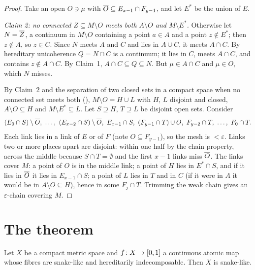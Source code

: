 \begin{proof}
Take an open $O\ni\mu$ with $\overline{O}\subseteq E_{x-1}\cap F_{y-1}$, and let $E^*$ be the union of $E$.

\emph{Claim 2: no connected $Z\subseteq M\setminus O$ meets both $A\setminus O$ and $M\setminus E^*$.} Otherwise let $N=\overline{Z}$, a continuum in $M\setminus O$
containing a point $a\in A$ and a point $z\notin E^*$; then $z\notin A$, so $z\in C$. Since $N$ meets $A$ and $C$ and lies in $A\cup C$, it meets $A\cap C$.
By hereditary unicoherence $Q=N\cap C$ is a continuum; it lies in $C$, meets $A\cap C$, and contains $z\notin A\cap C$. By Claim~1, $A\cap C\subseteq Q\subseteq
N$. But $\mu\in A\cap C$ and $\mu\in O$, which $N$ misses.

By Claim~2 and the separation of two closed sets in a compact space when no connected set meets both (), $M\setminus O=H\cup L$ with $H$,
$L$ disjoint and closed, $A\setminus O\subseteq H$ and $M\setminus E^*\subseteq L$. Let $S\supseteq H$, $T\supseteq L$ be disjoint open sets. Consider
\[
(E_0\cap S)\setminus\overline{O},\ \dots,\ (E_{x-2}\cap S)\setminus\overline{O},\ E_{x-1}\cap S,\ (F_{y-1}\cap T)\cup O,\ F_{y-2}\cap T,\ \dots,\ F_0\cap T.
\]
Each link lies in a link of $E$ or of $F$ (note $O\subseteq F_{y-1}$), so the mesh is $<\varepsilon$. Links two or more places apart are disjoint: within one
half by the chain property, across the middle because $S\cap T=\emptyset$ and the first $x-1$ links miss $\overline{O}$. The links cover $M$: a point of $O$ is in
the middle link; a point of $H$ lies in $E^*\cap S$, and if it lies in $\overline{O}$ it lies in $E_{x-1}\cap S$; a point of $L$ lies in $T$ and in $C$ (if it were
in $A$ it would be in $A\setminus O\subseteq H$), hence in some $F_j\cap T$. Trimming the weak chain gives an $\varepsilon$-chain covering $M$.
\end{proof}


\section{The theorem}

\begin{theorem}\label{thm:atomic-snake}
Let $X$ be a compact metric space and $f\colon X\to[0,1]$ a continuous atomic map whose fibres are snake-like and hereditarily indecomposable. Then $X$ is
snake-like.
\end{theorem}

